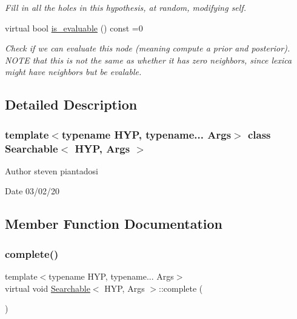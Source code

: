 \begin{DoxyCompactItemize}
\begin{DoxyCompactList}\small\item\em Fill in all the holes in this hypothesis, at random, modifying self. \end{DoxyCompactList}\item 
virtual bool \hyperlink{class_searchable_a23786e95730117c3cc4b90e010494a1e}{is\+\_\+evaluable} () const =0
\begin{DoxyCompactList}\small\item\em Check if we can evaluate this node (meaning compute a prior and posterior). N\+O\+TE that this is not the same as whether it has zero neighbors, since lexica might have neighbors but be evalable. \end{DoxyCompactList}\end{DoxyCompactItemize}


\subsection{Detailed Description}
\subsubsection*{template$<$typename H\+YP, typename... Args$>$\newline
class Searchable$<$ H\+Y\+P, Args $>$}

\begin{DoxyAuthor}{Author}
steven piantadosi 
\end{DoxyAuthor}
\begin{DoxyDate}{Date}
03/02/20 
\end{DoxyDate}


\subsection{Member Function Documentation}
\mbox{\label{class_searchable_a3ae6263b49a0f9da94f5dcc23af6618e}} 
\subsubsection{\texorpdfstring{complete()}{complete()}}
{\footnotesize\ttfamily template$<$typename H\+YP, typename... Args$>$ \\
virtual void \hyperlink{class_searchable}{Searchable}$<$ H\+YP, Args $>$\+::complete (\begin{DoxyParamCaption}{ }\end{DoxyParamCaption})\hspace{0.3cm}{\ttfamily [pure virtual]}}



